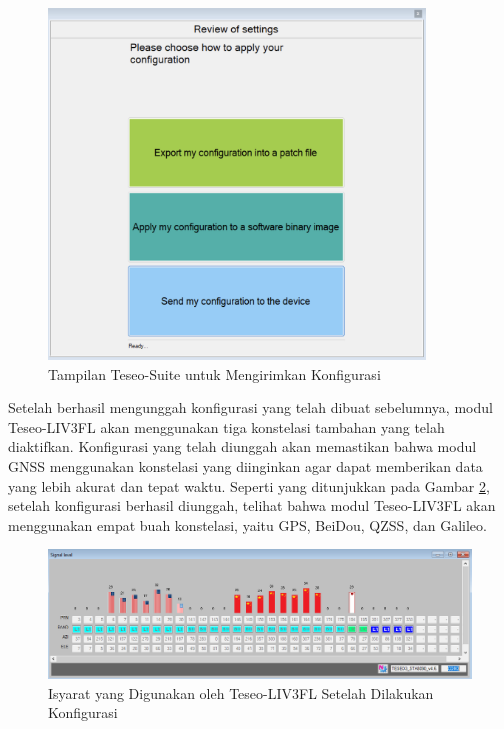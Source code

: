 \begin{figure}[H]
	\centering
	\includegraphics[width=10cm]{contents/chapter-3/setting-konstelasi/kirim-konfigurasi.png}
	\caption{Tampilan Teseo-Suite untuk Mengirimkan Konfigurasi}
	\label{Fig: kirim-konstelasi}
\end{figure}

Setelah berhasil mengunggah konfigurasi yang telah dibuat sebelumnya, modul Teseo-LIV3FL akan menggunakan tiga konstelasi tambahan yang telah diaktifkan. Konfigurasi yang telah diunggah akan memastikan bahwa modul GNSS menggunakan konstelasi yang diinginkan agar dapat memberikan data yang lebih akurat dan tepat waktu. Seperti yang ditunjukkan pada Gambar \ref{Fig: setelah-konfigurasi}, setelah konfigurasi berhasil diunggah, telihat bahwa modul Teseo-LIV3FL akan menggunakan empat buah konstelasi, yaitu GPS, BeiDou, QZSS, dan Galileo. 

\begin{figure}[H]
	\centering
	\includegraphics[width=14cm]{contents/chapter-3/setting-konstelasi/setelah-konfigurasi.png}
	\caption{Isyarat yang Digunakan oleh Teseo-LIV3FL Setelah Dilakukan Konfigurasi}
	\label{Fig: setelah-konfigurasi}
	\end{figure}

